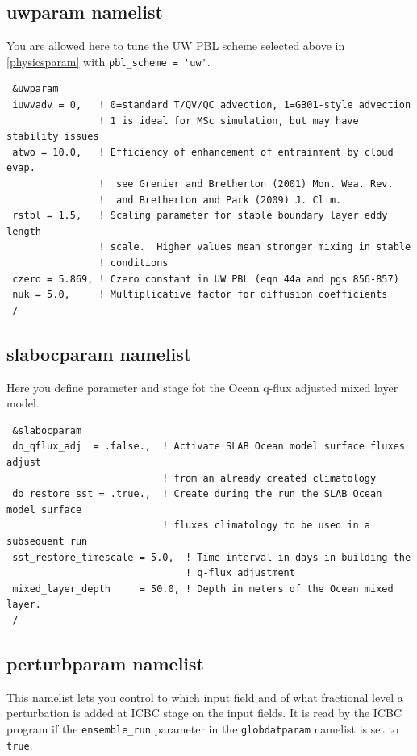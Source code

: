 \subsection{uwparam namelist}

You are allowed here to tune the UW PBL scheme selected above in
\ref{physicsparam} with \verb|pbl_scheme = 'uw'|.

{\footnotesize
\begin{Verbatim}
 &uwparam
 iuwvadv = 0,   ! 0=standard T/QV/QC advection, 1=GB01-style advection
                ! 1 is ideal for MSc simulation, but may have stability issues
 atwo = 10.0,   ! Efficiency of enhancement of entrainment by cloud evap.
                !  see Grenier and Bretherton (2001) Mon. Wea. Rev.
                !  and Bretherton and Park (2009) J. Clim.
 rstbl = 1.5,   ! Scaling parameter for stable boundary layer eddy length
                ! scale.  Higher values mean stronger mixing in stable 
                ! conditions
 czero = 5.869, ! Czero constant in UW PBL (eqn 44a and pgs 856-857)
 nuk = 5.0,     ! Multiplicative factor for diffusion coefficients
 /
\end{Verbatim}
}

\subsection{slabocparam namelist}

Here you define parameter and stage fot the Ocean q-flux adjusted mixed layer
model.

{\footnotesize
\begin{Verbatim}
 &slabocparam
 do_qflux_adj  = .false.,  ! Activate SLAB Ocean model surface fluxes adjust
                           ! from an already created climatology
 do_restore_sst = .true.,  ! Create during the run the SLAB Ocean model surface
                           ! fluxes climatology to be used in a subsequent run
 sst_restore_timescale = 5.0,  ! Time interval in days in building the
                               ! q-flux adjustment
 mixed_layer_depth     = 50.0, ! Depth in meters of the Ocean mixed layer.
 /
\end{Verbatim}
}

\subsection{perturbparam namelist}

This namelist lets you control to which input field and of what fractional
level a perturbation is added at ICBC stage on the input fields.
It is read by the ICBC program if the \verb=ensemble_run= parameter in the
\verb=globdatparam= namelist is set to \verb=true=.

